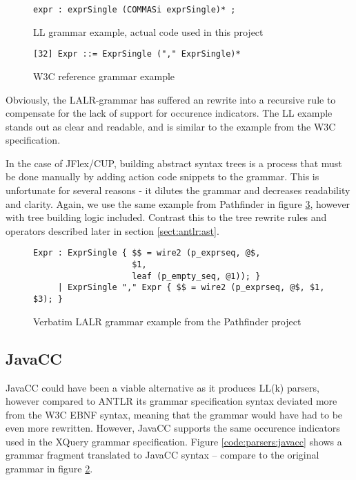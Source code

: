 \begin{figure}[h!]
\begin{Verbatim}
expr : exprSingle (COMMASi exprSingle)* ;
\end{Verbatim}
\caption[LL grammar example]{LL grammar example, actual code used in this project}
\label{code:parsers:ll}
\end{figure}

\begin{figure}[h!]
\begin{Verbatim}
[32] Expr ::= ExprSingle ("," ExprSingle)*
\end{Verbatim}
\caption{ W3C reference grammar example }
\label{code:parsers:w3c}
\end{figure}

Obviously, the LALR-grammar has suffered an rewrite into a recursive
rule to compensate for the lack of support for occurence indicators. The LL
example stands out as clear and readable, and is similar to the example from the
W3C specification.

In the case of JFlex/CUP, building abstract syntax trees is a process that must
be done manually by adding action code snippets to the grammar. This is
unfortunate for several reasons - it dilutes the grammar and decreases
readability and clarity. Again, we use the same example from Pathfinder in
figure \ref{code:parsers:lalr2}, however with tree building logic included.
Contrast this to the tree rewrite rules and operators described later in section
\ref{sect:antlr:ast}.

\begin{figure}[h!]
\begin{Verbatim}
Expr : ExprSingle { $$ = wire2 (p_exprseq, @$,
                    $1,
                    leaf (p_empty_seq, @1)); }
     | ExprSingle "," Expr { $$ = wire2 (p_exprseq, @$, $1, $3); }
\end{Verbatim}
\caption[LALR grammar example]{Verbatim LALR grammar example from the Pathfinder
project\cite{pathfinderHome}}
\label{code:parsers:lalr2}
\end{figure}

\subsection{JavaCC}
JavaCC could have been a viable alternative as it produces LL(k) parsers,
however compared to ANTLR its grammar specification syntax deviated more
from the W3C EBNF syntax, meaning that the grammar would have had to be
even more rewritten. However, JavaCC supports the same occurence indicators
used in the XQuery grammar specification. Figure \ref{code:parsers:javacc} shows
a grammar fragment translated to JavaCC syntax -- compare to the original grammar
in figure \ref{code:parsers:w3c}.

